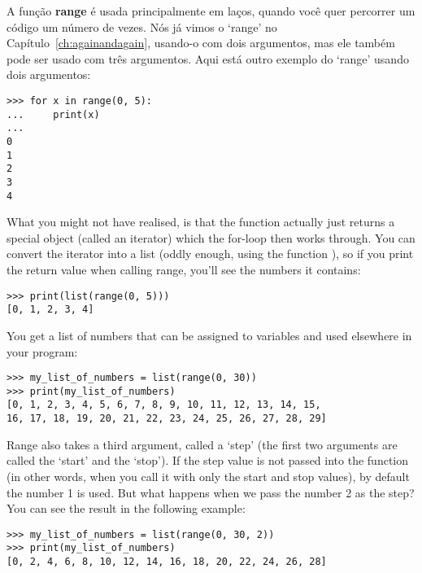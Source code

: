 A função \textbf{range} é usada principalmente em laços, quando você quer percorrer um código um número de vezes. Nós já vimos o `range' no Capítulo~\ref{ch:againandagain}, usando-o com dois argumentos, mas ele também pode ser usado com três argumentos. Aqui está outro exemplo do `range' usando dois argumentos:

\begin{listing}
\begin{verbatim}
>>> for x in range(0, 5):
...     print(x)
... 
0
1
2
3
4
\end{verbatim}
\end{listing}

\noindent
What you might not have realised, is that the  function actually just returns a special object (called an iterator) which the for-loop then works through. You can convert the iterator into a list (oddly enough, using the function ), so if you print the return value when calling range, you'll see the numbers it contains:

\begin{listing}
\begin{verbatim}
>>> print(list(range(0, 5)))
[0, 1, 2, 3, 4]
\end{verbatim}
\end{listing}

\noindent
You get a list of numbers that can be assigned to variables and used elsewhere in your program:

\begin{listingignore}
\begin{verbatim}
>>> my_list_of_numbers = list(range(0, 30))
>>> print(my_list_of_numbers)
[0, 1, 2, 3, 4, 5, 6, 7, 8, 9, 10, 11, 12, 13, 14, 15, 
16, 17, 18, 19, 20, 21, 22, 23, 24, 25, 26, 27, 28, 29]
\end{verbatim}
\end{listingignore}

\noindent
Range also takes a third argument, called a `step' (the first two arguments are called the `start' and the `stop'). If the step value is not passed into the function (in other words, when you call it with only the start and stop values), by default the number 1 is used. But what happens when we pass the number 2 as the step?  You can see the result in the following example:

\begin{listing}
\begin{verbatim}
>>> my_list_of_numbers = list(range(0, 30, 2))
>>> print(my_list_of_numbers)
[0, 2, 4, 6, 8, 10, 12, 14, 16, 18, 20, 22, 24, 26, 28]
\end{verbatim}
\end{listing}

